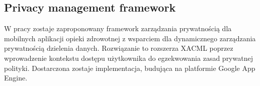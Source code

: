 \subsection{Privacy management framework \cite{Ammar2014}}
W pracy zostaje zaproponowany framework zarządzania prywatnością dla mobilnych aplikacji opieki zdrowotnej z wsparciem dla dynamicznego zarządzania prywatnością dzielenia danych. Rozwiązanie to rozszerza XACML poprzez wprowadzenie kontekstu dostępu użytkownika do egzekwowania zasad prywatnej polityki. Dostarczona zostaje implementacja, budująca na platformie Google App Engine.

